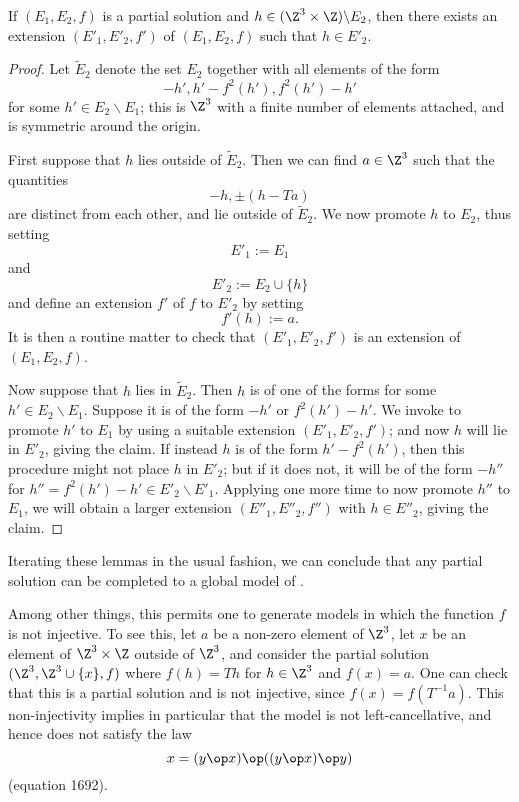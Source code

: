 \begin{lemma}[Promoting to $E_2$]\label{add-E2}  If $(E_1,E_2,f)$ is a partial solution and $h \in (\Z^3 \times \Z) \backslash E_2$, then there exists an extension $(E'_1,E'_2,f')$ of $(E_1,E_2,f)$ such that $h \in E'_2$.
\end{lemma}

\begin{proof}  Let $\tilde E_2$ denote the set $E_2$ together with all elements of the form
\begin{equation}\label{hp-form}
 -h', h' - f^2(h'), f^2(h') - h'
\end{equation}
for some $h' \in E_2 \backslash E_1$; this is $\Z^3$ with a finite number of elements attached, and is symmetric around the origin.

First suppose that $h$ lies outside of $\tilde E_2$.  Then we can find $a \in \Z^3$ such that the quantities
$$ -h, \pm (h - Ta)$$
are distinct from each other, and lie outside of $\tilde E_2$.  We now promote $h$ to $E_2$, thus setting
$$ E'_1 := E_1$$
and
$$ E'_2 := E_2 \cup \{h\}$$
and define an extension $f'$ of $f$ to $E'_2$ by setting
$$ f'(h) := a.$$
It is then a routine matter to check that $(E'_1,E'_2,f')$ is an extension of $(E_1,E_2,f)$.

Now suppose that $h$ lies in $\tilde E_2$.  Then $h$ is of one of the forms  for some $h' \in E_2 \backslash E_1$.  Suppose it is of the form $-h'$ or $f^2(h') - h'$.  We invoke  to promote $h'$ to $E_1$ by using a suitable extension $(E'_1,E'_2,f')$; and now $h$ will lie in $E'_2$, giving the claim.  If instead $h$ is of the form $h'-f^2(h')$, then this procedure might not place $h$ in $E'_2$; but if it does not, it will be of the form $-h''$ for $h'' = f^2(h')-h' \in E'_2 \backslash E'_1$.  Applying  one more time to now promote $h''$ to $E_1$, we will obtain a larger extension $(E''_1,E''_2,f'')$ with $h \in E''_2$, giving the claim.
\end{proof}

Iterating these lemmas in the usual fashion, we can conclude that any partial solution can be completed to a global model of .

Among other things, this permits one to generate models in which the function $f$ is not injective.  To see this, let $a$ be a non-zero element of $\Z^3$, let $x$ be an element of $\Z^3 \times \Z$ outside of $\Z^3$, and consider the partial solution $(\Z^3, \Z^3 \cup \{x\}, f)$ where $f(h) = Th$ for $h \in \Z^3$ and $f(x) = a$.  One can check that this is a partial solution and is not injective, since $f(x) = f(T^{-1} a)$.  This non-injectivity implies in particular that the model is not left-cancellative, and hence does not satisfy the law
$$ x = (y \op x) \op ((y \op x) \op y)$$
(equation 1692).

